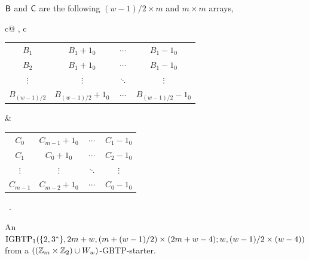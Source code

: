 \documentclass[draft, 11pt]{article}
\begin{document}
\begin{figure}
\vskip 5pt
\normalsize\flushleft ${\sf B}$ and ${\sf C}$ are the following $(w-1)/2\times m$ and $m\times m$ arrays,
\vskip 5pt
\renewcommand{\arraystretch}{1.2}
\setlength{\tabcolsep}{1pt} 
\centering \small
\begin{tabular}{c@{ , }c}
\begin{tabular}{|cccc|}
\hline
$B_1$ & $B_1+1_0$ & $\cdots$ & $B_1-1_0$ \\ 
$B_2$ & $B_1+1_0$ & $\cdots$ & $B_1-1_0$ \\ 
$\vdots$ & $\vdots$ & $\ddots$ & $\vdots$ \\
$B_{(w-1)/2}$ & $B_{(w-1)/2}+1_0$ & $\cdots$ & $B_{(w-1)/2}-1_0$ \\
\hline
\end{tabular}
&
\begin{tabular}{|cccc|}
\hline
$C_0$ 		& $C_{m-1}+1_0$ 	& $\cdots$ & $C_1-1_0$ \\ 
$C_1$ 		& $C_0+1_0$ 		& $\cdots$ & $C_2-1_0$ \\ 
$\vdots$ 		& $\vdots$ 		& $\ddots$ & $\vdots$ \\
$C_{m-1}$ 	& $C_{m-2}+1_0$ 	& $\cdots$ & $C_{0}-1_0$ \\
\hline
\end{tabular}
\end{tabular}\ .
 \caption{An ${\rm IGBTP}_1(\{2,3^*\},2m+w,(m+(w-1)/2)\times(2m+w-4);w,(w-1)/2\times (w-4))$ 
 from a $((\mathbb Z_m\times \mathbb Z_2) \cup W_w)$-GBTP-starter.}
 \label{fig:GBTPstarter-Z2}
\end{figure} 
\end{document}

